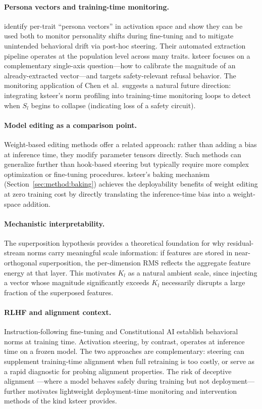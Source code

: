 \documentclass[10pt]{article}
\begin{document}
\paragraph{Persona vectors and training-time monitoring.}
\citet{chen2025persona} identify per-trait ``persona vectors'' in activation
space and show they can be used both to monitor personality shifts during
fine-tuning and to mitigate unintended behavioral drift via post-hoc steering.
Their automated extraction pipeline operates at the population level across
many traits.  ksteer focuses on a complementary single-axis question---how to
calibrate the magnitude of an already-extracted vector---and targets safety-relevant
refusal behavior.  The monitoring application of Chen et al.\ suggests a natural
future direction: integrating ksteer's norm profiling into training-time monitoring
loops to detect when $S_l$ begins to collapse (indicating loss of a safety circuit).

\paragraph{Model editing as a comparison point.}
Weight-based editing methods \citep{fierro2025weight} offer a related approach:
rather than adding a bias at inference time, they modify parameter tensors
directly.  Such methods can generalize further than hook-based steering but
typically require more complex optimization or fine-tuning procedures.  ksteer's
baking mechanism (Section~\ref{sec:method:baking}) achieves the deployability
benefits of weight editing at zero training cost by directly translating the
inference-time bias into a weight-space addition.

\paragraph{Mechanistic interpretability.}
The superposition hypothesis \citep{elhage2022toy} provides a theoretical
foundation for why residual-stream norms carry meaningful scale information:
if features are stored in near-orthogonal superposition, the per-dimension RMS
reflects the aggregate feature energy at that layer.  This motivates $K_l$ as
a natural ambient scale, since injecting a vector whose magnitude significantly
exceeds $K_l$ necessarily disrupts a large fraction of the superposed features.

\paragraph{RLHF and alignment context.}
Instruction-following fine-tuning \citep{ouyang2022instructgpt} and
Constitutional AI \citep{bai2022constitutional} establish behavioral norms
at training time.  Activation steering, by contrast, operates at inference
time on a frozen model.  The two approaches are complementary: steering can
supplement training-time alignment when full retraining is too costly, or
serve as a rapid diagnostic for probing alignment properties.  The risk of
deceptive alignment \citep{hubinger2019risks}---where a model behaves safely
during training but not deployment---further motivates lightweight deployment-time
monitoring and intervention methods of the kind ksteer provides.
\end{document}
